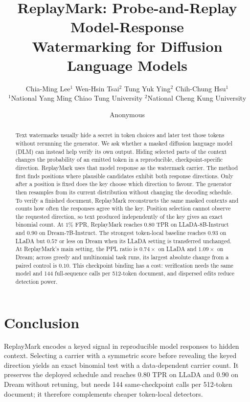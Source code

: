 \documentclass{article}
\title{ReplayMark: Probe-and-Replay Model-Response\\Watermarking for Diffusion Language Models}
\author{%
Chia-Ming Lee$^{1}$ \quad Wen-Hsin Tsai$^{2}$ \quad
Tung Yuk Ying$^{2}$ \quad Chih-Chung Hsu$^{1}$\\[0.4em]
{\normalfont\small $^{1}$National Yang Ming Chiao Tung University \quad
$^{2}$National Cheng Kung University}%
}
\author{Anonymous}
\newif\ifpublicversion
\theoremstyle{definition}
\begin{document}
\maketitle

\begin{abstract}
Text watermarks usually hide a secret in token choices and later test those tokens without
rerunning the generator. We ask whether a masked diffusion language model (DLM) can instead help
verify its own output. Hiding selected parts of the context changes the probability of an emitted
token in a reproducible, checkpoint-specific direction. ReplayMark uses that model response as the
watermark carrier.
The method first finds positions where plausible candidates exhibit both response directions.
Only after a position is fixed does the key choose which direction to favour. The generator then
resamples from its current distribution without changing the decoding schedule. To verify a
finished document, ReplayMark reconstructs the same masked contexts and counts how often the
responses agree with the key. Position selection cannot observe the requested direction, so text
produced independently of the key gives an exact binomial count.
At $1\%$ FPR, ReplayMark reaches $0.80$ TPR on LLaDA-8B-Instruct and $0.90$ on
Dream-7B-Instruct. The strongest token-local baseline reaches $0.93$ on LLaDA but $0.57$ or less
on Dream when its LLaDA setting is transferred unchanged. At ReplayMark's main setting, the PPL
ratio is $0.74\times$ on LLaDA and $1.09\times$ on Dream; across greedy and multinomial task
runs, its largest absolute change from a paired control is $0.10$. This checkpoint binding has a
cost: verification needs the same model and 144 full-sequence calls per 512-token document, and
dispersed edits reduce detection power.
\ifpublicversion
Code is available at \url{https://github.com/ming053l/ReplayMark}.
\fi
\end{abstract}








\section{Conclusion}
\label{sec:conclusion}

ReplayMark encodes a keyed signal in reproducible model responses to hidden context. Selecting a
carrier with a symmetric score before revealing the keyed direction yields an exact binomial test
with a data-dependent carrier count. It preserves the deployed schedule and reaches $0.80$ TPR on
LLaDA and $0.90$ on Dream without retuning, but needs 144 same-checkpoint calls per 512-token
document; it therefore complements cheaper token-local detectors.
\end{document}
